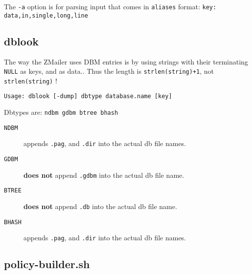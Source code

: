 The {\tt -a} option is for parsing input that comes in 
{\tt aliases} format: {\tt key: data,in,single,long,line}




\subsection{dblook}



The way the ZMailer uses DBM entries is by using strings with 
their terminating {\tt NULL} as keys, and as data.. Thus the 
length is {\tt strlen(string)+1}, not {\tt strlen(string)} !

\begin{verbatim}
Usage: dblook [-dump] dbtype database.name [key]
\end{verbatim}


Dbtypes are: {\tt ndbm gdbm btree bhash}

\begin{description}
\item[{\tt NDBM}] \mbox{}

appends {\tt .pag}, and {\tt .dir} 
into the actual db file names.

\item[{\tt GDBM}] \mbox{}

{\bf does not} append {\tt .gdbm} 
into the actual db file name.

\item[{\tt BTREE}] \mbox{}

{\bf does not} append {\tt .db} 
into the actual db file name.

\item[{\tt BHASH}] \mbox{}

appends {\tt .pag}, and {\tt .dir} 
into the actual db file names.

\end{description}





\subsection{policy-builder.sh}



